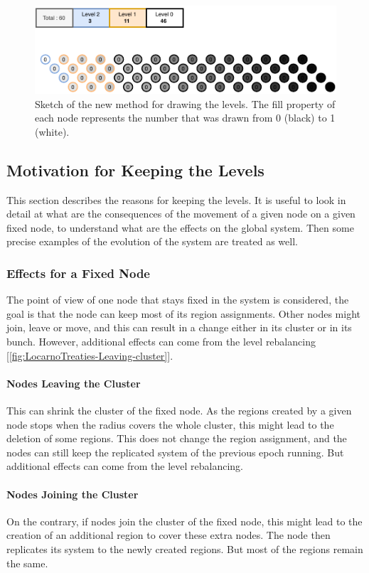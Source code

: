 \documentclass[a4paper,11pt,twoside,openright]{report}
\begin{document}
\begin{figure}[!h] 
\centering
\includegraphics[width=400pt]{figures/Lottery-Locarno}
\caption{Sketch of the new method for drawing the levels. The fill property of each node represents
 the number that was drawn from 0 (black) to 1 (white).}
 \label{fig:sketch-new-levels}
\end{figure}


\subsection{Motivation for Keeping the Levels} This section describes the
reasons for keeping the levels. It is useful to look in detail at what are the consequences of
the movement of a given node on a given fixed node, to understand what are the effects on the
global system. Then some precise examples
of the evolution of the system are treated as well. 

\subsubsection{Effects for a Fixed Node} The point of view of one node that
stays fixed in the system is considered, the goal is that the node can keep most of
its region assignments. Other nodes might join, leave or move, and this can result in a change either in its cluster or in its bunch. However, additional effects can
come from the level rebalancing
[\autoref{fig:LocarnoTreaties-Leaving-cluster}]. 

\paragraph{Nodes Leaving the Cluster} This can shrink the cluster of the fixed
node. As the regions created by a given node stops when the radius covers the
whole cluster, this might lead to the deletion of some regions. This does not
change the region assignment, and the nodes can still keep the replicated system
of the previous epoch running. But additional effects can come from the level
rebalancing. 

\paragraph{Nodes Joining the Cluster} On the contrary, if nodes join the
cluster of the fixed node, this might lead to the creation of an additional
region to cover these extra nodes. The node then replicates its system to
the newly created regions. But most of the regions remain the same.
\end{document}
